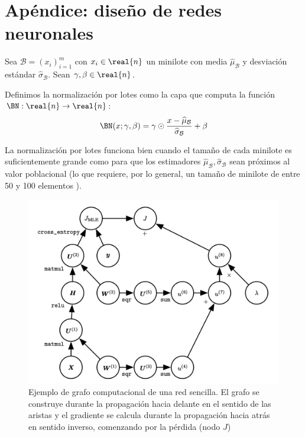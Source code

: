 \chapter{Apéndice: diseño de redes neuronales} \label{chapter:appendixA}
\begin{definition}
    Sea \( \mathcal{B} = (x_{i})_{i=1}^m \) con \( x_{i} \in \real{n} \) un minilote con media \( \widehat{\mu}_\mathcal{B} \) y desviación estándar  \( \widehat{\sigma}_\mathcal{B} \). Sean \( \gamma, \beta \in \real{n} \).

    Definimos la normalización por lotes como la capa que computa la función \( \BN: \real{n} \to \real{n} \):
    \[
        \BN(x; \gamma, \beta) = \gamma \odot \frac{x - \widehat{\mu}_\mathcal{B}}{\widehat{\sigma}_\mathcal{B}} + \beta
    \]
\end{definition}

La normalización por lotes funciona bien cuando el tamaño de cada minilote es suficientemente grande como para que los estimadores \( \widehat{\mu}_\mathcal{B}, \widehat{\sigma}_\mathcal{B} \) sean próximos al valor poblacional (lo que requiere, por lo general, un tamaño de minilote de entre 50 y 100 elementos \cite{luo2018towards}).

\begin{figure}[tb]
    \centering
    \includegraphics[scale=0.6]{figures/chapter2/grafo.png}
    \caption{Ejemplo de grafo computacional de una red sencilla. El grafo se construye durante la propagación hacia delante en el sentido de las aristas y el gradiente se calcula durante la propagación hacia atrás en sentido inverso, comenzando por la pérdida (nodo \( J\)) \cite{goodfellow2016deep}}
    \label{fig:graph}
\end{figure}


